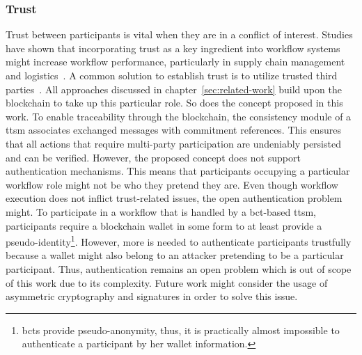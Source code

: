 \subsubsection{Trust}
\label{sec:evaluation:qualitative_analysis:privacy_criteria:trust}
Trust between participants is vital when they are in a conflict of interest. Studies have shown that incorporating trust as a key ingredient into workflow systems might increase workflow performance, particularly in supply chain management and logistics~\cite{fynes2005_impact_of_relationships_on_supply_chain_performance,johnston2004_supplier_trust_performance}.
A common solution to establish trust is to utilize trusted third parties~\cite{impact_of_trust_on_supply_chains,trust_in_service_oriented_ds_through_blockchain}. All approaches discussed in chapter~\ref{sec:related-work} build upon the blockchain to take up this particular role. So does the concept proposed in this work. To enable traceability through the blockchain, the consistency module of a \gls{ttsm} associates exchanged messages with commitment references. This ensures that all actions that require multi-party participation are undeniably persisted and can be verified. However, the proposed concept does not support authentication mechanisms. This means that participants occupying a particular workflow role might not be who they pretend they are. Even though workflow execution does not inflict trust-related issues, the open authentication problem might. To participate in a workflow that is handled by a \gls{bct}-based \gls{ttsm}, participants require a blockchain wallet in some form to at least provide a pseudo-identity\footnote{\glspl{bct} provide pseudo-anonymity, thus, it is practically almost impossible to authenticate a participant by her wallet information.}. However, more is needed to authenticate participants trustfully because a wallet might also belong to an attacker pretending to be a particular participant. Thus, authentication remains an open problem which is out of scope of this work due to its complexity. Future work might consider the usage of asymmetric cryptography and signatures in order to solve this issue.

